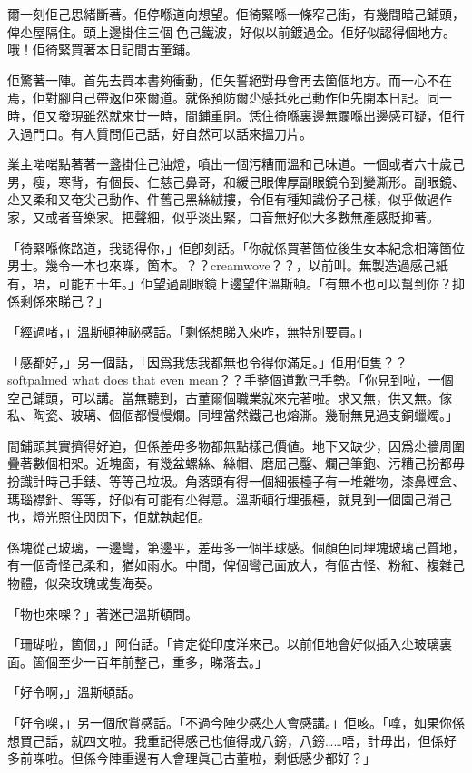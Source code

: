 爾一刻佢己思緒斷著。佢停喺道向想望。佢徛緊喺一條窄己街，有幾間暗己鋪頭，俾尐屋隔住。頭上邊掛住三個𠞉色己鐵波，好似以前鍍過金。佢好似認得個地方。哦！佢徛緊買著本日記間古董鋪。

佢驚著一陣。首先去買本書夠衝動，佢矢誓絕對毋會再去箇個地方。而一心不在焉，佢對腳自己帶返佢來爾道。就係預防爾尐感抵死己動作佢先開本日記。同一時，佢又發現雖然就來廿一時，間鋪重開。恁住徛喺裏邊無躝喺出邊感可疑，佢行入過門口。有人質問佢己話，好自然可以話來搵刀片。

業主啱啱點著著一盞掛住己油燈，噴出一個污糟而溫和己味道。一個或者六十歲己男，瘦，寒背，有個長、仁慈己鼻哥，和緩己眼俾厚副眼鏡令到變澌形。副眼鏡、尐又柔和又奄尖己動作、件舊己黑絲絨摟，令佢有種知識份子己樣，似乎做過作家，又或者音樂家。把聲細，似乎淡出緊，口音無好似大多數無產感貶抑著。

「徛緊喺條路道，我認得你，」佢卽刻話。「你就係買著箇位後生女本紀念相簿箇位男士。幾令一本也來㗎，箇本。？？creamwove？？，以前叫。無製造過感己紙有，唔，可能五十年。」佢望過副眼鏡上邊望住溫斯頓。「有無不也可以幫到你？抑係剩係來睇己？」

「經過啫，」溫斯頓神祕感話。「剩係想睇入來咋，無特別要買。」

「感都好，」另一個話，「因爲我恁我都無也令得你滿足。」佢用佢隻？？softpalmed what does that even mean？？手整個道歉己手勢。「你見到啦，一個空己鋪頭，可以講。當無聽到，古董爾個職業就來完著啦。求又無，供又無。傢私、陶瓷、玻璃、個個都慢慢爛。同埋當然鐵己也熔澌。幾耐無見過支銅蠟燭。」

間鋪頭其實擠得好迫，但係差毋多物都無點樣己價値。地下又缺少，因爲尐牆周圍疊著數個相架。近塊窗，有幾盆螺絲、絲帽、磨屈己鑿、爛己筆鉋、污糟己扮都毋扮識計時己手錶、等等己垃圾。角落頭有得一個細張檯子有一堆雜物，漆鼻煙盒、瑪瑙襟針、等等，好似有可能有尐得意。溫斯頓行埋張檯，就見到一個園己滑己也，燈光照住閃閃下，佢就執起佢。

係塊從己玻璃，一邊彎，第邊平，差毋多一個半球感。個顏色同埋塊玻璃己質地，有一個奇怪己柔和，猶如雨水。中間，俾個彎己面放大，有個古怪、粉紅、複雜己物體，似朶玫瑰或隻海葵。

「物也來㗎？」著迷己溫斯頓問。

「珊瑚啦，箇個，」阿伯話。「肯定從印度洋來己。以前佢地會好似插入尐玻璃裏面。箇個至少一百年前整己，重多，睇落去。」

「好令啊，」溫斯頓話。

「好令㗎，」另一個欣賞感話。「不過今陣少感尐人會感講。」佢咳。「嗱，如果你係想買己話，就四文啦。我重記得感己也値得成八鎊，八鎊……唔，計毋出，但係好多前㗎啦。但係今陣重邊有人會理眞己古董啦，剩低感少都好？」

